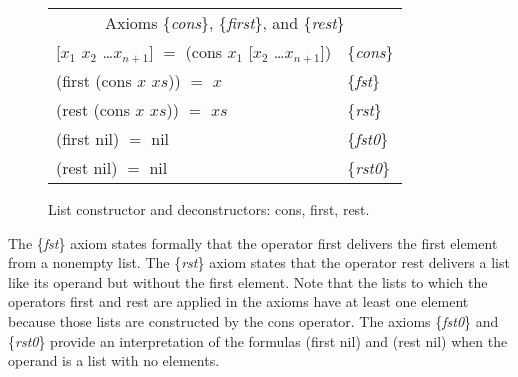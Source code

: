 \begin{figure}
\begin{tabular}{ll}
 \multicolumn{2}{c}{Axioms \{\emph{cons}\}, \{\emph{first}\}, and \{\emph{rest}\}} \\
 \textsf{[$x_1$ $x_2$ \dots $x_{n+1}$]} $=$ \textsf{(cons $x_1$ [$x_2$ \dots $x_{n+1}$])} & \{\emph{cons}\} \\
 \hline
 \textsf{(first (cons $x$ $xs$))} $=$ $x$                                        & \{\emph{fst}\}\\
 \textsf{(rest (cons $x$ $xs$))}  $=$ $xs$                                       & \{\emph{rst}\} \\
 \textsf{(first nil)} $=$ \textsf{nil}                                           & \{\emph{fst0}\}\\
 \textsf{(rest nil)} $=$ \textsf{nil}                                            & \{\emph{rst0}\}\\
\end{tabular}
\caption{List constructor and deconstructors: \textsf{cons}, \textsf{first}, \textsf{rest}.}
\label{first-rest-cons}
\end{figure}

The \{\emph{fst}\} axiom states formally that
the operator \textsf{first} delivers the first element from a nonempty list.
The \{\emph{rst}\} axiom states that the operator \textsf{rest} delivers
a list like its operand but without the first element.
Note that the lists to which the operators \textsf{first} and \textsf{rest}
are applied in the axioms have at least one element
because those lists are constructed by the \textsf{cons} operator.
The axioms
\{\emph{fst0}\} and \{\emph{rst0}\}
provide an interpretation of the formulas
\textsf{(first nil)} and \textsf{(rest nil)}
when the operand is a list with no elements.

